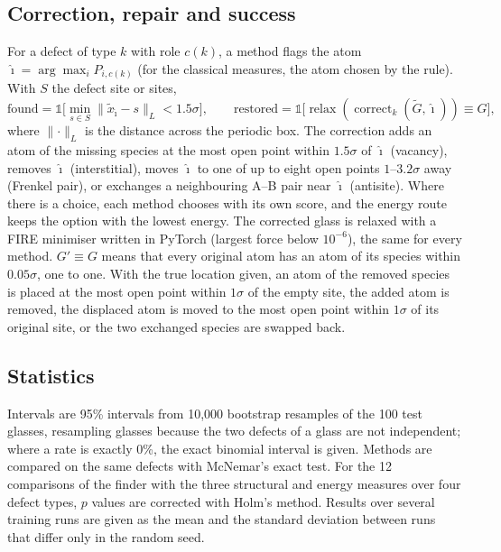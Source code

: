 \documentclass[11pt]{article}
\begin{document}
\subsection*{Correction, repair and success}
For a defect of type $k$ with role $c(k)$, a method flags the atom $\hat\imath=\arg\max_i P_{i,c(k)}$ (for the classical measures, the atom chosen by the rule). With $S$ the defect site or sites,
\begin{equation}
\text{found}=\mathbb 1\Big[\min_{s\in S}\lVert \tilde x_{\hat\imath}-s\rVert_L<1.5\sigma\Big],\qquad
\text{restored}=\mathbb 1\big[\operatorname{relax}(\operatorname{correct}_k(\tilde G,\hat\imath))\equiv G\big],
\label{eq:metrics}
\end{equation}
where $\lVert\cdot\rVert_L$ is the distance across the periodic box. The correction adds an atom of the missing species at the most open point within $1.5\sigma$ of $\hat\imath$ (vacancy), removes $\hat\imath$ (interstitial), moves $\hat\imath$ to one of up to eight open points $1$--$3.2\sigma$ away (Frenkel pair), or exchanges a neighbouring A--B pair near $\hat\imath$ (antisite). Where there is a choice, each method chooses with its own score, and the energy route keeps the option with the lowest energy. The corrected glass is relaxed with a FIRE minimiser written in PyTorch (largest force below $10^{-6}$), the same for every method. $G'\equiv G$ means that every original atom has an atom of its species within $0.05\sigma$, one to one. With the true location given, an atom of the removed species is placed at the most open point within $1\sigma$ of the empty site, the added atom is removed, the displaced atom is moved to the most open point within $1\sigma$ of its original site, or the two exchanged species are swapped back.

\subsection*{Statistics}
Intervals are 95\% intervals from 10,000 bootstrap resamples of the 100 test glasses\citep{efron1993}, resampling glasses because the two defects of a glass are not independent; where a rate is exactly 0\%, the exact binomial interval is given. Methods are compared on the same defects with McNemar's exact test\citep{mcnemar1947}. For the 12 comparisons of the finder with the three structural and energy measures over four defect types, $p$ values are corrected with Holm's method\citep{holm1979}. Results over several training runs are given as the mean and the standard deviation between runs that differ only in the random seed.
\end{document}
